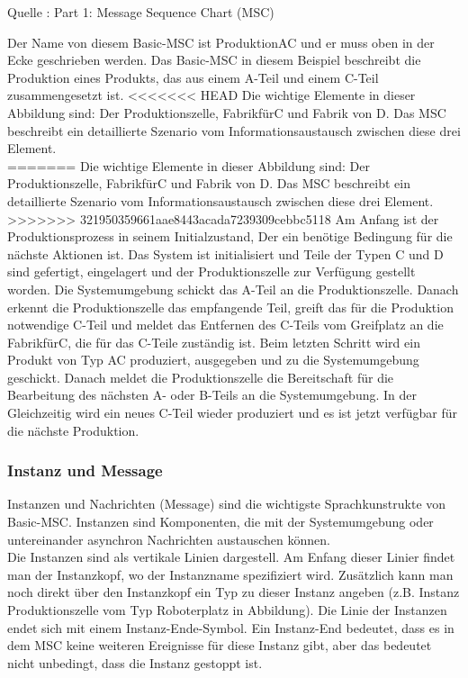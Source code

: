 

Quelle : \cite{MT009}
Part 1: Message Sequence Chart (MSC) 

 

Der Name von diesem Basic-MSC ist ProduktionAC und er muss oben in der Ecke geschrieben werden. Das Basic-MSC in diesem Beispiel beschreibt die Produktion eines Produkts, das aus einem A-Teil und einem C-Teil zusammengesetzt ist.
<<<<<<< HEAD
Die wichtige Elemente in dieser Abbildung sind: Der Produktionszelle, FabrikfürC und Fabrik von D. Das MSC beschreibt ein detaillierte Szenario vom Informationsaustausch zwischen diese drei Element.\\

=======
Die wichtige Elemente in dieser Abbildung sind: Der Produktionszelle, FabrikfürC und Fabrik von D. Das MSC beschreibt ein detaillierte Szenario vom Informationsaustausch zwischen diese drei Element. 
>>>>>>> 321950359661aae8443acada7239309cebbc5118
Am Anfang ist der Produktionsprozess in seinem Initialzustand, Der ein benötige Bedingung für die nächste Aktionen ist. 
 Das System ist initialisiert und Teile
der Typen C und D sind gefertigt, eingelagert und der
Produktionszelle zur Verfügung gestellt worden.
 Die Systemumgebung schickt das A-Teil an die Produktionszelle.
 Danach erkennt die Produktionszelle das empfangende Teil, greift das für die Produktion notwendige C-Teil und meldet das Entfernen des
 C-Teils vom Greifplatz an die FabrikfürC, die für das C-Teile zuständig ist. 
 Beim letzten Schritt wird ein Produkt von Typ AC produziert, ausgegeben und zu die Systemumgebung geschickt.
Danach meldet die Produktionszelle die Bereitschaft
für die Bearbeitung des nächsten A- oder B-Teils
an die Systemumgebung.
In der Gleichzeitig wird ein neues C-Teil wieder produziert und es ist jetzt verfügbar für die nächste Produktion.

\subsubsection{Instanz und Message}
Instanzen und Nachrichten (Message) sind die wichtigste Sprachkunstrukte von Basic-MSC.
Instanzen sind Komponenten, die mit der Systemumgebung oder untereinander
asynchron Nachrichten austauschen können.\\
Die Instanzen sind als vertikale Linien dargestell. Am Enfang dieser Linier findet man der Instanzkopf, wo der Instanzname spezifiziert wird. Zusätzlich kann man noch direkt über den Instanzkopf ein Typ zu dieser Instanz angeben (z.B. Instanz Produktionszelle vom Typ Roboterplatz in Abbildung).
Die Linie der Instanzen endet sich mit einem Instanz-Ende-Symbol. Ein Instanz-End bedeutet, dass es in dem MSC keine weiteren Ereignisse für diese Instanz gibt, aber das bedeutet nicht unbedingt, dass die Instanz gestoppt ist.\\


